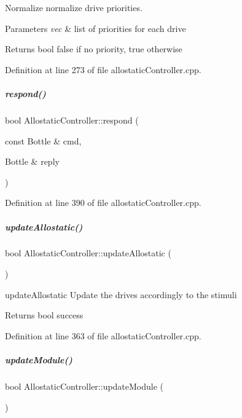 Normalize normalize drive priorities. 


\begin{DoxyParams}{Parameters}
{\em vec} & list of priorities for each drive \\
\hline
\end{DoxyParams}
\begin{DoxyReturn}{Returns}
bool false if no priority, true otherwise 
\end{DoxyReturn}


Definition at line 273 of file allostatic\+Controller.\+cpp.

\mbox{\label{group__allostaticController_ae647895ab1c78e36dbc52fed8b276120}} 
\subparagraph{\texorpdfstring{respond()}{respond()}}
{\footnotesize\ttfamily bool Allostatic\+Controller\+::respond (\begin{DoxyParamCaption}\item[{const Bottle \&}]{cmd,  }\item[{Bottle \&}]{reply }\end{DoxyParamCaption})}



Definition at line 390 of file allostatic\+Controller.\+cpp.

\mbox{\label{group__allostaticController_a448eb3497467e10577e6a03ef55633f3}} 
\subparagraph{\texorpdfstring{update\+Allostatic()}{updateAllostatic()}}
{\footnotesize\ttfamily bool Allostatic\+Controller\+::update\+Allostatic (\begin{DoxyParamCaption}{ }\end{DoxyParamCaption})}



update\+Allostatic Update the drives accordingly to the stimuli 

\begin{DoxyReturn}{Returns}
bool success 
\end{DoxyReturn}


Definition at line 363 of file allostatic\+Controller.\+cpp.

\mbox{\label{group__allostaticController_aace595e55a9517470a9d241b64e57c22}} 
\subparagraph{\texorpdfstring{update\+Module()}{updateModule()}}
{\footnotesize\ttfamily bool Allostatic\+Controller\+::update\+Module (\begin{DoxyParamCaption}{ }\end{DoxyParamCaption})}




